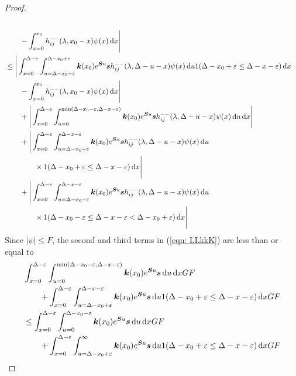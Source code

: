 \begin{proof}
\begin{align}
		  \\&\qquad{}- \int_{x=0}^{x_0} h_{ij}^{--}(\lambda, x_0 - x)\psi(x)\, \mathrm{d} x \Bigg| \nonumber 
		\\&\leq \Bigg| \int_{x=0}^{\Delta-\varepsilon}\int_{u=\Delta-x_0-\varepsilon}^{\Delta-x_0+\varepsilon} \boldsymbol k(x_0)e^{\boldsymbol Su}\boldsymbol s h_{ij}^{--}(\lambda, \Delta - u - x) \psi(x) \, \mathrm{d} u 1(\Delta-x_0+\varepsilon\leq \Delta-x-\varepsilon) \, \mathrm{d} x\nonumber
		\\&\qquad{} - \int_{x=0}^{x_0} h_{ij}^{--}(\lambda, x_0 - x)\psi(x)\, \mathrm{d} x \Bigg| \nonumber 
		\\&\qquad {}+\Bigg|\int_{x=0}^{\Delta-\varepsilon}\int_{u=0}^{\min(\Delta-x_0-\varepsilon,\Delta-x-\varepsilon)} \boldsymbol k(x_0)e^{\boldsymbol Su}\boldsymbol s h_{ij}^{--}(\lambda, \Delta - u - x) \psi(x) \, \mathrm{d} u \, \mathrm{d} x\Bigg|\nonumber
		\\&\qquad {}+\Bigg|\int_{x=0}^{\Delta-\varepsilon}\int_{u=\Delta-x_0+\varepsilon}^{\Delta-x-\varepsilon} \boldsymbol k(x_0)e^{\boldsymbol Su}\boldsymbol s h_{ij}^{--}(\lambda, \Delta - u - x) \psi(x) \, \mathrm{d} u \nonumber 
		\\&\qquad\qquad \times1(\Delta-x_0+\varepsilon\leq \Delta - x -\varepsilon)\, \mathrm{d} x\Bigg|\nonumber
		\\&\qquad {}+\Bigg|\int_{x=0}^{\Delta-\varepsilon}\int_{u=\Delta-x_0-\varepsilon}^{\Delta-x-\varepsilon} \boldsymbol k(x_0)e^{\boldsymbol Su}\boldsymbol s h_{ij}^{--}(\lambda, \Delta - u - x) \psi(x) \, \mathrm{d} u \nonumber
		\\&\qquad\qquad \times 1(\Delta-x_0-\varepsilon\leq \Delta - x -\varepsilon < \Delta-x_0+\varepsilon)\, \mathrm{d} x\Bigg|   \label{eqn: LLkkK}
	\end{align}
	Since \(|\psi|\leq F\), the second and third terms in (\ref{eqn: LLkkK}) are less than or equal to 
	\begin{align}
		&\int_{x=0}^{\Delta-\varepsilon}\int_{u=0}^{\min(\Delta-x_0-\varepsilon,\Delta-x-\varepsilon)} \bs k(x_0)e^{\bs Su}\bs s  \wrt u \wrt xGF \nonumber
		\\&\qquad {}+\int_{x=0}^{\Delta-\varepsilon}\int_{u=\Delta-x_0+\varepsilon}^{\Delta-x-\varepsilon} \bs k(x_0)e^{\bs Su}\bs s  \wrt u 1(\Delta-x_0+\varepsilon\leq \Delta - x -\varepsilon)\wrt x GF \nonumber
		\\&\leq \int_{x=0}^{\Delta-\varepsilon}\int_{u=0}^{\Delta-x_0-\varepsilon} \bs k(x_0)e^{\bs Su}\bs s  \wrt u \wrt xGF \nonumber
		\\&\qquad {}+\int_{x=0}^{\Delta-\varepsilon}\int_{u=\Delta-x_0+\varepsilon}^{\infty} \bs k(x_0)e^{\bs Su}\bs s  \wrt u 1(\Delta-x_0+\varepsilon\leq \Delta - x -\varepsilon)\wrt x GF \nonumber

\end{align}
\end{proof}
